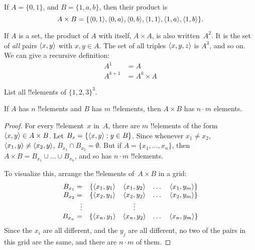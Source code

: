 \documentclass[../../../include/open-logic-section]{subfiles}
\begin{document}
\begin{ex}
If $A = \{0, 1\}$, and $B = \{1, a, b\}$, then their product is
\[
A \times B = \{ \langle 0, 1 \rangle, \langle 0, a \rangle, \langle 0, b \rangle,
    \langle 1, 1 \rangle, \langle 1, a \rangle, \langle 1, b \rangle \}.
\]
\end{ex}

\begin{ex}
If $A$ is a set, the product of $A$ with itself, $A \times A$, is also
written~$A^2$. It is the set of \emph{all} pairs $\langle x, y \rangle$ with
$x, y \in A$. The set of all triples $\langle x, y, z \rangle$ is $A^3$, and
so on. We can give a recursive definition:
\begin{align*}
  A^1 & = A\\
  A^{k+1} & = A^k \times A
\end{align*}
\end{ex}

\begin{prob}
List all !!{element}s of $\{1, 2, 3\}^3$.
\end{prob}

\begin{prop}
If $A$ has $n$ !!{element}s and $B$ has $m$ !!{element}s, then $A
\times B$ has $n\cdot m$ elements.
\end{prop}

\begin{proof}
For every !!{element}~$x$ in~$A$, there are $m$ !!{element}s of the
form $\langle x, y \rangle \in A \times B$. Let $B_x = \{ \langle x, y \rangle : y
  \in B \}$. Since whenever $x_1 \neq x_2$, $\langle x_1, y \rangle \neq
\langle x_2, y \rangle$, $B_{x_1} \cap B_{x_2} = \emptyset$. But if $A = \{x_1,
\dots, x_n\}$, then $A \times B = B_{x_1} \cup \dots \cup B_{x_n}$, and so has
$n\cdot m$ !!{element}s.

To visualize this, arrange the !!{element}s of~$A \times B$ in a grid:
\[
\begin{array}{rcccc}
  B_{x_1} = & \{\langle x_1, y_1 \rangle & \langle x_1, y_2 \rangle & \dots & \langle x_1, y_m \rangle\}\\
  B_{x_2} = & \{\langle x_2, y_1 \rangle & \langle x_2, y_2 \rangle & \dots & \langle x_2, y_m \rangle\}\\
  \vdots & & \vdots\\
  B_{x_n} = & \{\langle x_n, y_1 \rangle & \langle x_n, y_2 \rangle & \dots & \langle x_n, y_m \rangle\}
\end{array}
\]
Since the $x_i$ are all different, and the $y_j$ are all different, no
two of the pairs in this grid are the same, and there are $n\cdot m$
of them.
\end{proof}
\end{document}
